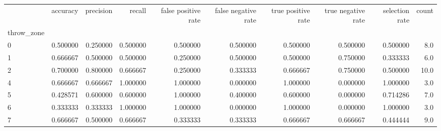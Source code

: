 \begin{tabular}{lrrrrrrrrr}
\toprule
{} &  accuracy &  precision &    recall &  false positive rate &  false negative rate &  true positive rate &  true negative rate &  selection rate &  count \\
throw\_zone &           &            &           &                      &                      &                     &                     &                 &        \\
\midrule
0          &  0.500000 &   0.250000 &  0.500000 &             0.500000 &             0.500000 &            0.500000 &            0.500000 &        0.500000 &    8.0 \\
1          &  0.666667 &   0.500000 &  0.500000 &             0.250000 &             0.500000 &            0.500000 &            0.750000 &        0.333333 &    6.0 \\
2          &  0.700000 &   0.800000 &  0.666667 &             0.250000 &             0.333333 &            0.666667 &            0.750000 &        0.500000 &   10.0 \\
4          &  0.666667 &   0.666667 &  1.000000 &             1.000000 &             0.000000 &            1.000000 &            0.000000 &        1.000000 &    3.0 \\
5          &  0.428571 &   0.600000 &  0.600000 &             1.000000 &             0.400000 &            0.600000 &            0.000000 &        0.714286 &    7.0 \\
6          &  0.333333 &   0.333333 &  1.000000 &             1.000000 &             0.000000 &            1.000000 &            0.000000 &        1.000000 &    3.0 \\
7          &  0.666667 &   0.500000 &  0.666667 &             0.333333 &             0.333333 &            0.666667 &            0.666667 &        0.444444 &    9.0 \\
\bottomrule
\end{tabular}
